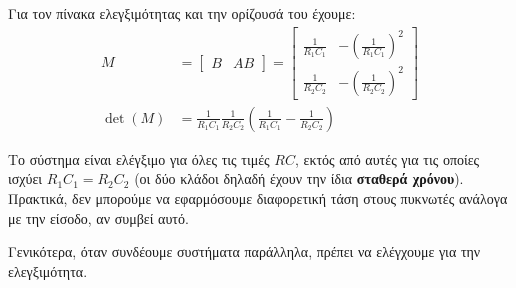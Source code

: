 \documentclass[11pt,a4paper,notitlepage,fleqn]{article}
\begin{document}
\begin{exercise}
	Για τον πίνακα ελεγξιμότητας και την ορίζουσά του έχουμε:
	\begin{align*}
	M &= \left[\begin{matrix}
	B & AB
	\end{matrix}\right] = \left[\begin{matrix}
	\frac{1}{R_1C_1} & -\left(\frac{1}{R_1C_1}\right)^2\\
	\frac{1}{R_2C_2} & -\left(\frac{1}{R_2C_2}\right)^2
	\end{matrix}\right]\\
	\det(M) &= \frac{1}{R_1C_1}\frac{1}{R_2C_2}\left(
	\frac{1}{R_1C_1}-\frac{1}{R_2C_2}
	\right)
	\end{align*}

	Το σύστημα είναι ελέγξιμο για όλες τις τιμές \( RC \), εκτός από
	αυτές για τις οποίες ισχύει \( R_1C_1 = R_2C_2 \) (οι δύο κλάδοι
	δηλαδή έχουν την ίδια \textbf{σταθερά χρόνου}). Πρακτικά, δεν μπορούμε
	να εφαρμόσουμε διαφορετική τάση στους πυκνωτές ανάλογα με την είσοδο,
	αν συμβεί αυτό.
\end{exercise}

Γενικότερα, όταν συνδέουμε συστήματα παράλληλα, πρέπει να ελέγχουμε για
την ελεγξιμότητα.
\end{document}

